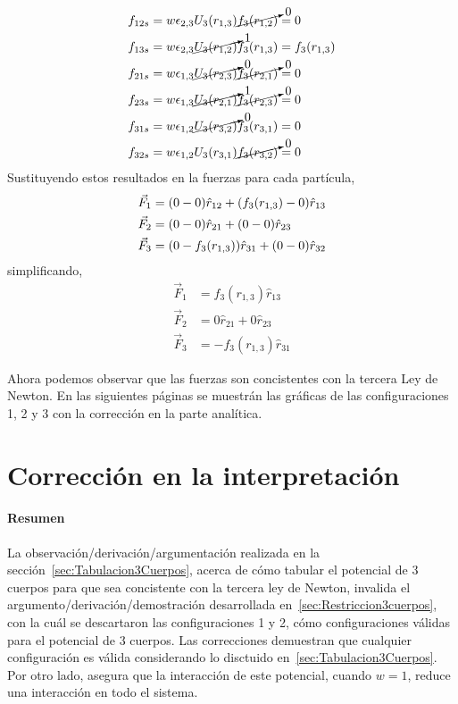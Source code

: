 \documentclass[../main.tex]{subfiles}
\begin{document}
\begin{align*}
    f_{12s} &= w\epsilon_{2,3}U_3(r_{1,3})\cancelto{0}{f_3(r_{1,2})} = 0  \\
    f_{13s} &= w\epsilon_{2,3}\cancelto{1}{U_3(r_{1,2})}f_3(r_{1,3}) = f_3(r_{1,3}) \\
    f_{21s} &= w\epsilon_{1,3}\cancelto{0}{U_3(r_{2,3})}\cancelto{0}{f_3(r_{2,1})} = 0 \\
    f_{23s} &= w\epsilon_{1,3}\cancelto{1}{U_3(r_{2,1})}\cancelto{0}{f_3(r_{2,3})} = 0 \\
    f_{31s} &= w\epsilon_{1,2}\cancelto{0}{U_3(r_{3,2})}f_3(r_{3,1}) = 0 \\
    f_{32s} &= w\epsilon_{1,2}U_3(r_{3,1})\cancelto{0}{f_3(r_{3,2})} = 0
\end{align*}
Sustituyendo estos resultados en la fuerzas para cada partícula,
\begin{align*}
    \vec{F}_1 &= \qty(0 - 0)\hat{r}_{12} + \qty(f_3(r_{1,3}) - 0)\hat{r}_{13} \\
    \vec{F}_2 &= \qty(0 - 0)\hat{r}_{21} + \qty(0 - 0)\hat{r}_{23} \\
    \vec{F}_3 &= \qty(0 - f_3(r_{1,3}))\hat{r}_{31} + \qty(0 - 0)\hat{r}_{32}
\end{align*}
simplificando,
\begin{align*}
    \vec{F}_1 &= f_3(r_{1,3})\hat{r}_{13} \\
    \vec{F}_2 &= 0\hat{r}_{21} + 0\hat{r}_{23} \\
    \vec{F}_3 &= - f_3(r_{1,3})\hat{r}_{31}
\end{align*}

Ahora podemos observar que las fuerzas son concistentes con la tercera Ley de Newton. 
En las siguientes páginas se muestrán las gráficas de las configuraciones 1, 2 y 3 con la corrección en la parte analítica.

\newpage

\section{Corrección en la interpretación}

\paragraph{Resumen}
La observación/derivación/argumentación realizada en la sección~\ref{sec:Tabulacion3Cuerpos}, acerca de cómo tabular el potencial de 3 cuerpos para que sea concistente con la tercera ley de Newton, invalida el argumento/derivación/demostración desarrollada en~\ref{sec:Restriccion3cuerpos}, con la cuál se descartaron las configuraciones 1 y 2, cómo configuraciones válidas para el potencial de 3 cuerpos.
Las correcciones demuestran que cualquier configuración es válida considerando lo disctuido en~\ref{sec:Tabulacion3Cuerpos}. 
Por otro lado, asegura que la interacción de este potencial, cuando \(w=1\), reduce una interacción en todo el sistema.
\end{document}
